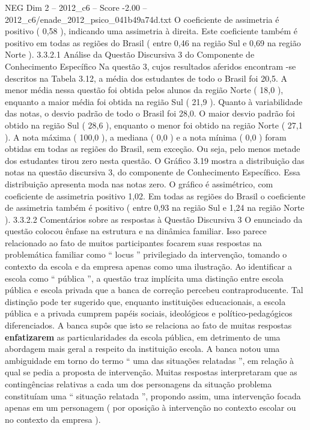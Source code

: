 \begin{textsample}{NEG Dim 2 – 2012\_c6 – Score -2.00 – 2012\_c6/enade\_2012\_psico\_041b49a74d.txt}
O coeficiente de assimetria é positivo ( 0,58 ), indicando uma assimetria à direita.
Este coeficiente também é positivo em todas as regiões do Brasil ( entre 0,46 na região Sul e 0,69 na região Norte ). 3.3.2.1 Análise da Questão Discursiva 3 do Componente de Conhecimento Específico Na questão 3, cujos resultados aferidos encontram -se descritos na Tabela 3.12, a média dos estudantes de todo o Brasil foi 20,5.
A menor média nessa questão foi obtida pelos alunos da região Norte ( 18,0 ), enquanto a maior média foi obtida na região Sul ( 21,9 ).
Quanto à variabilidade das notas, o desvio padrão de todo o Brasil foi 28,0.
O maior desvio padrão foi obtido na região Sul ( 28,6 ), enquanto o menor foi obtido na região Norte ( 27,1 ).
A nota máxima ( 100,0 ), a mediana ( 0,0 ) e a nota mínima ( 0,0 ) foram obtidas em todas as regiões do Brasil, sem exceção.
Ou seja, pelo menos metade dos estudantes tirou zero nesta questão.
O Gráfico 3.19 mostra a distribuição das notas na questão discursiva 3, do componente de Conhecimento Específico.
Essa distribuição apresenta moda nas notas zero.
O gráfico é assimétrico, com coeficiente de assimetria positivo 1,02.
Em todas as regiões do Brasil o coeficiente de assimetria também é positivo ( entre 0,93 na região Sul e 1,24 na região Norte ). 3.3.2.2 Comentários sobre as respostas à Questão Discursiva 3 O enunciado da questão colocou ênfase na estrutura e na dinâmica familiar.
Isso parece relacionado ao fato de muitos participantes focarem suas respostas na problemática familiar como “ locus ” privilegiado da intervenção, tomando o contexto da escola e da empresa apenas como uma ilustração.
Ao identificar a escola como “ pública ”, a questão traz implícita uma distinção entre escola pública e escola privada que a banca de correção percebeu contraproducente.
Tal distinção pode ter sugerido que, enquanto instituições educacionais, a escola pública e a privada cumprem papéis sociais, ideológicos e político-pedagógicos diferenciados.
A banca supôs que isto se relaciona ao fato de muitas respostas \textbf{enfatizarem} as particularidades da escola pública, em detrimento de uma abordagem mais geral a respeito da instituição escola.
A banca notou uma ambiguidade em torno do termo “ uma das situações relatadas ”, em relação à qual se pedia a proposta de intervenção.
Muitas respostas interpretaram que as contingências relativas a cada um dos personagens da situação problema constituíam uma “ situação relatada ”, propondo assim, uma intervenção focada apenas em um personagem ( por oposição à intervenção no contexto escolar ou no contexto da empresa ).

\end{textsample}

